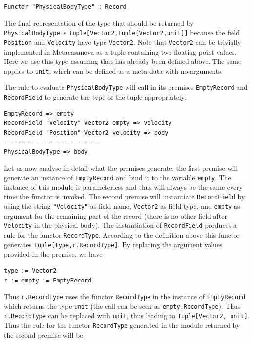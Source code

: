 \begin{lstlisting}
Functor "PhysicalBodyType" : Record
\end{lstlisting}

The final representation of the type that should be returned by\\ \texttt{PhysicalBodyType} is \texttt{Tuple[Vector2,Tuple[Vector2,unit]]} because the field \texttt{Position} and \texttt{Velocity} have type \texttt{Vector2}. Note that \texttt{Vector2} can be trivially implemented in Metacasanova as a tuple containing two floating point values. Here we use this type assuming that has already been defined above. The same appiles to \texttt{unit}, which can be defined as a meta-data with no arguments.

The rule to evaluate \texttt{PhysicalBodyType} will call in its premises \texttt{EmptyRecord} and \texttt{RecordField} to generate the type of the tuple appropriately:

\begin{lstlisting}
EmptyRecord => empty
RecordField "Velocity" Vector2 empty => velocity
RecordField "Position" Vector2 velocity => body
----------------------------
PhysicalBodyType => body
\end{lstlisting}

Let us now analyse in detail what the premises generate: the first premise will generate an instance of \texttt{EmptyRecord} and bind it to the variable \texttt{empty}. The instance of this module is parameterless and thus will always be the same every time the functor is invoked. The second premise will instantiate \texttt{RecordField} by using the string \texttt{"Velocity"} as field name, \texttt{Vector2} as field type, and \texttt{empty} as argument for the remaining part of the record (there is no other field after \texttt{Velocity} in the physical body). The instantiation of \texttt{RecordField} produces a rule for the functor \texttt{RecordType}. According to the definition above this functor generates \texttt{Tuple[type,r.RecordType]}. By replacing the argument values provided in the premise, we have 

\begin{lstlisting}
type := Vector2
r := empty := EmptyRecord
\end{lstlisting}

\noindent
Thus \texttt{r.RecordType} uses the functor \texttt{RecordType} in the instance of \texttt{EmptyRecord} which returns the type \texttt{unit} (the call can be seen as \texttt{empty.RecordType}). Thus \texttt{r.RecordType} can be replaced with \texttt{unit}, thus leading to \texttt{Tuple[Vector2, unit]}. Thus the rule for the functor \texttt{RecordType} generated in the module returned by the second premise will be.

